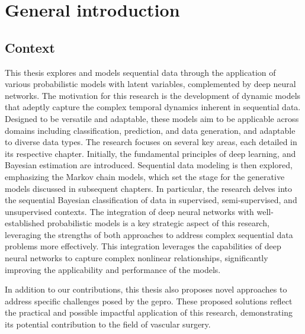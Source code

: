 \chapter*{General introduction}


\section*{Context} 

This thesis explores and models sequential data through the application of
various probabilistic models with latent variables, complemented by deep neural
networks. The motivation for this research is the development of dynamic models
that adeptly capture the complex temporal dynamics inherent in sequential data.
Designed to be versatile and adaptable, these models aim to be applicable across
domains including classification, prediction, and data generation, and adaptable
to diverse data types. 
The research focuses on several key areas, each detailed
in its respective chapter. Initially, the fundamental principles of deep
learning, and Bayesian estimation are introduced. Sequential data modeling is then
explored, emphasizing the Markov chain models, which set the stage for the
generative models discussed in subsequent chapters. 
In particular, the research delves into the sequential Bayesian classification 
of data in supervised,
semi-supervised, and unsupervised contexts. The integration of deep neural
networks with well-established probabilistic models is a key strategic aspect of
this research, leveraging the strengths of both approaches to address complex
sequential data problems more effectively. This integration leverages the
capabilities of deep neural networks to capture complex nonlinear relationships,
significantly improving the applicability and performance of the models.


In addition to our contributions, this thesis also
proposes novel approaches to address specific challenges posed by the
\gls*{gepro}. These proposed solutions reflect the practical and  possible
impactful application of this research, demonstrating its potential
contribution to the field of vascular surgery.


